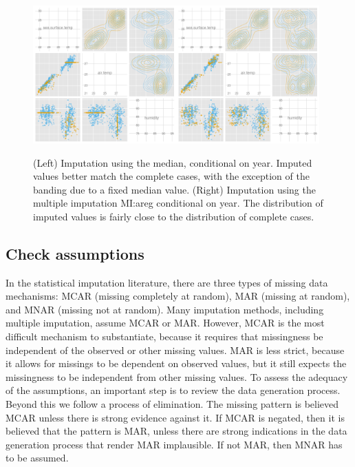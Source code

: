 \documentclass[article]{jss}
\begin{document}
\begin{figure}[htp]
\centerline{\includegraphics[width=0.49\textwidth]{graph/fig4-2-median-condition}\includegraphics[width=0.49\textwidth]{graph/fig4-4-areg-condition}}
\caption{(Left) Imputation using the median, conditional on year.
Imputed values better match the complete cases, with the
exception of the banding due to a fixed median value.
(Right) Imputation using the multiple imputation MI:areg
conditional on year. The distribution of imputed values is
fairly close to the distribution of complete cases.}
\label{fig:tao3}
\end{figure}


\subsection{Check assumptions}

In the statistical imputation literature, there are three types of
missing data mechanisms: MCAR (missing completely at random), MAR
(missing at random), and MNAR (missing not at random). Many
imputation methods, including multiple imputation, assume MCAR or MAR.
However, MCAR is the most difficult mechanism to substantiate,
because it requires that missingness be independent of the observed
or other missing values. MAR is less strict, because it allows for
missings to be dependent on observed values, but it still expects
the missingness to be independent from other missing values. To
assess the adequacy of the assumptions, an important step is to
review the data generation process. Beyond this we follow a process
of elimination. The missing pattern is believed MCAR unless there
is strong evidence against it. If MCAR is negated, then it is
believed that the pattern is MAR, unless there are strong indications
in the data generation process that render MAR implausible.
If not MAR, then MNAR has to be assumed.
\end{document}
